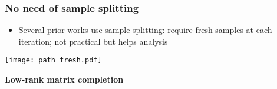 \documentclass[compress,
mathserif,wide,%
]{beamer}
\begin{document}
\begin{frame}
\frametitle{No need of sample splitting}

\begin{itemize}
  \item Several prior works use sample-splitting: require \alert{fresh samples} at each iteration; not practical but helps analysis 
\end{itemize}
  \begin{center}
     \texttt{[image: path\_fresh.pdf]} 
  \end{center}



\end{frame}




\begin{frame}[plain]

\vfill
\begin{center}
  {\Large \bf Low-rank matrix completion}
\end{center}
\vfill

\end{frame}

\end{document}
